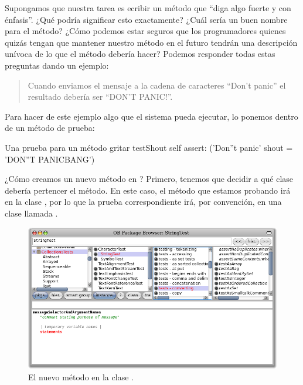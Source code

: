 \documentclass[a4paper,10pt,twoside]{book}
\begin{document}
Supongamos que nuestra tarea es ecribir un m\'etodo que ``diga algo fuerte y con \'enfasis''. ¿Qu\'e podr\'ia significar esto exactamente? ¿Cu\'al ser\'ia un buen nombre para el m\'etodo? ¿C\'omo podemos estar seguros que los programadores quienes quiz\'as tengan que mantener nuestro m\'etodo en el futuro tendr\'an una descripci\'on un\'ivoca de lo que el m\'etodo deber\'ia hacer? Podemos responder todas estas preguntas dando un ejemplo:

\begin{quote}
Cuando enviamos el mensaje  a la cadena de caracteres ``Don't panic'' el resultado deber\'ia ser ``DON'T PANIC!''.
\end{quote}

\noindent
Para hacer de este ejemplo algo que el sistema pueda ejecutar, lo ponemos dentro de un m\'etodo de prueba:

\begin{method}[testShout]{Una prueba para un m\'etodo gritar}
testShout
	self assert: ('Don''t panic' shout = 'DON''T PANICBANG')
\end{method} %

¿C\'omo creamos un nuevo m\'etodo en \pharo? Primero, tenemos que decidir a qu\'e clase deber\'ia pertencer el m\'etodo.
En este caso, el m\'etodo  que estamos probando ir\'a en la clase , por lo que la prueba correspondiente ir\'a, por convenci\'on, en una clase llamada .

\begin{figure}[hbt]
\centerline {\includegraphics[width=\textwidth]{StringTest-newMethodTemplate}}
\caption{El nuevo m\'etodo en la clase .
}
\end{figure}
\end{document}
